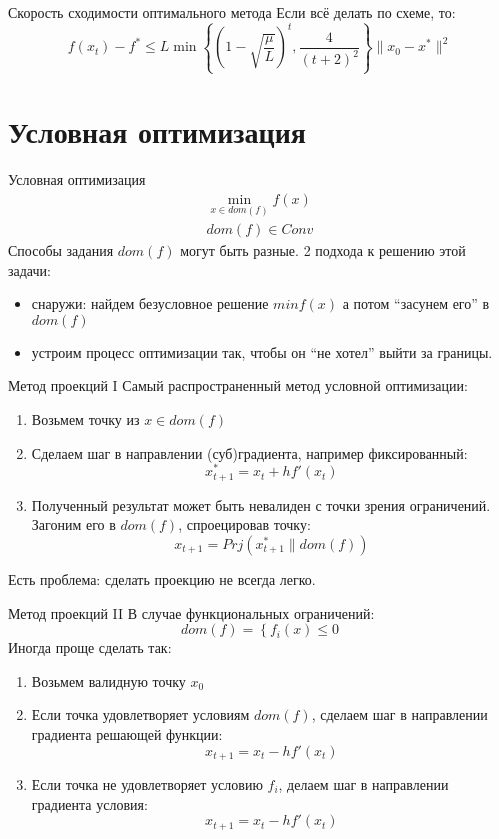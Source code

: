 \documentclass[14pt, fleqn, xcolor={dvipsnames, table}]{beamer}
\begin{document}
\begin{frame}{Скорость сходимости оптимального метода}
Если всё делать по схеме, то:
$$
f(x_t) - f^* \le L\min\left\{\left(1-\sqrt{\frac{\mu}{L}}\right)^t, \frac{4}{(t+2)^2}\right\}\|x_0-x^*\|^2
$$
\end{frame}

\section{Условная оптимизация}
\begin{frame}{Условная оптимизация}
\small
$$\begin{array}{c}
\min_{x \in dom(f)} f(x) \\
dom(f) \in Conv
\end{array}$$
Способы задания $dom(f)$ могут быть разные. 2 подхода к решению этой задачи:
\begin{itemize}
  \item снаружи: найдем безусловное решение $min f(x)$ а потом ``засунем его'' в $dom(f)$
  \item устроим процесс оптимизации так, чтобы он ``не хотел'' выйти за границы.
\end{itemize}
\end{frame}

\begin{frame}{Метод проекций I}
\small
Самый распространенный метод условной оптимизации:
\begin{enumerate}
  \item Возьмем точку из $x \in dom(f)$
  \item Сделаем шаг в направлении (суб)градиента, например фиксированный:
  $$
  x_{t+1}^* = x_t + h f'(x_t)
  $$
  \item Полученный результат может быть невалиден с точки зрения ограничений. Загоним его в $dom(f)$, спроецировав точку:
  $$
  x_{t+1} = Prj(x_{t+1}^* \| dom(f))
  $$
\end{enumerate}
Есть проблема: сделать проекцию не всегда легко.
\end{frame}

\begin{frame}{Метод проекций II}
\small
В случае функциональных ограничений:
\small
$$
dom(f) = \left\{f_i(x) \le 0\right.
$$
Иногда проще сделать так:
\begin{enumerate}
  \item Возьмем валидную точку $x_0$
  \item Если точка удовлетворяет условиям $dom(f)$, сделаем шаг в направлении градиента решающей функции:
  $$
  x_{t+1} = x_t - h f'(x_t)
  $$
  \item Если точка не удовлетворяет условию $f_i$, делаем шаг в направлении градиента условия:
  $$
  x_{t+1} = x_t - h f'(x_t)
  $$
\end{enumerate}
\end{frame}
\end{document}
